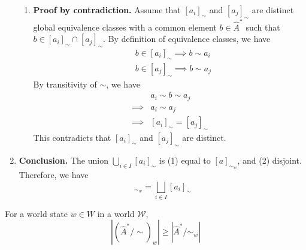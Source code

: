 \begin{proofE}
\begin{enumerate}[(1)]
\begin{enumerate}
        \item \textbf{Proof by contradiction.}
        Assume that $[a_{i}]_{\sim}$ and $[a_{j}]_{\sim}$ are distinct global equivalence classes with a common element $b \in \hat{A}^{*}$ such that $b \in [a_{i}]_{\sim} \cap [a_{j}]_{\sim}$.
        By definition of equivalence classes, we have
        \begin{align}
            & b \in [a_{i}]_{\sim} \implies b \sim a_{i} \\
            & b \in [a_{j}]_{\sim} \implies b \sim a_{j}
        \end{align}
        By transitivity of $\sim$, we have
        \begin{align}
            & a_{i} \sim b \sim a_{j} \\
            \implies & a_{i} \sim a_{j} \\
            \implies & [a_{i}]_{\sim} = [a_{j}]_{\sim}
        \end{align}
        This contradicts that $[a_{i}]_{\sim}$ and $[a_{j}]_{\sim}$ are distinct.
    \end{enumerate}

    \item \textbf{Conclusion.}
    The union $\bigcup_{i \in I}[a_{i}]_{\sim}$ is (1) equal to $[a]_{\sim_{w}}$, and (2) disjoint.
    Therefore, we have
    \begin{equation}
        [a]_{\sim_{w}} = \bigsqcup_{i \in I}[a_{i}]_{\sim}
    \end{equation}
\end{enumerate}
\end{proofE}

\begin{corollary}
    For a world state $w \in W$ in a world $\mathscr{W}$,
    \begin{equation}
        |(\hat{A}^{*}/\sim)_{w}| \geq | \hat{A}^{*}/\sim_{w}|
    \end{equation}
\end{corollary}





